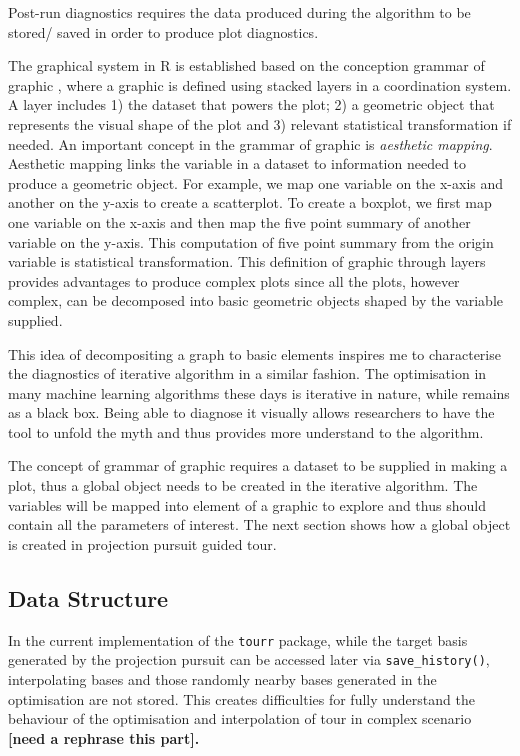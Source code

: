 \documentclass[12pt]{article}
\begin{document}
Post-run diagnostics requires the data produced during the algorithm to
be stored/ saved in order to produce plot diagnostics.

The graphical system in R is established based on the conception grammar
of graphic \citep{wickham2010layered}, where a graphic is defined using
stacked layers in a coordination system. A layer includes 1) the dataset
that powers the plot; 2) a geometric object that represents the visual
shape of the plot and 3) relevant statistical transformation if needed.
An important concept in the grammar of graphic is \emph{aesthetic
mapping}. Aesthetic mapping links the variable in a dataset to
information needed to produce a geometric object. For example, we map
one variable on the x-axis and another on the y-axis to create a
scatterplot. To create a boxplot, we first map one variable on the
x-axis and then map the five point summary of another variable on the
y-axis. This computation of five point summary from the origin variable
is statistical transformation. This definition of graphic through layers
provides advantages to produce complex plots since all the plots,
however complex, can be decomposed into basic geometric objects shaped
by the variable supplied.

This idea of decompositing a graph to basic elements inspires me to
characterise the diagnostics of iterative algorithm in a similar
fashion. The optimisation in many machine learning algorithms these days
is iterative in nature, while remains as a black box. Being able to
diagnose it visually allows researchers to have the tool to unfold the
myth and thus provides more understand to the algorithm.

The concept of grammar of graphic requires a dataset to be supplied in
making a plot, thus a global object needs to be created in the iterative
algorithm. The variables will be mapped into element of a graphic to
explore and thus should contain all the parameters of interest. The next
section shows how a global object is created in projection pursuit
guided tour.

\hypertarget{data-structure}{%
\subsection{Data Structure}\label{data-structure}}

In the current implementation of the \texttt{tourr} package, while the
target basis generated by the projection pursuit can be accessed later
via \texttt{save\_history()}, interpolating bases and those randomly
nearby bases generated in the optimisation are not stored. This creates
difficulties for fully understand the behaviour of the optimisation and
interpolation of tour in complex scenario \textbf{{[}need a rephrase
this part{]}.}
\end{document}
